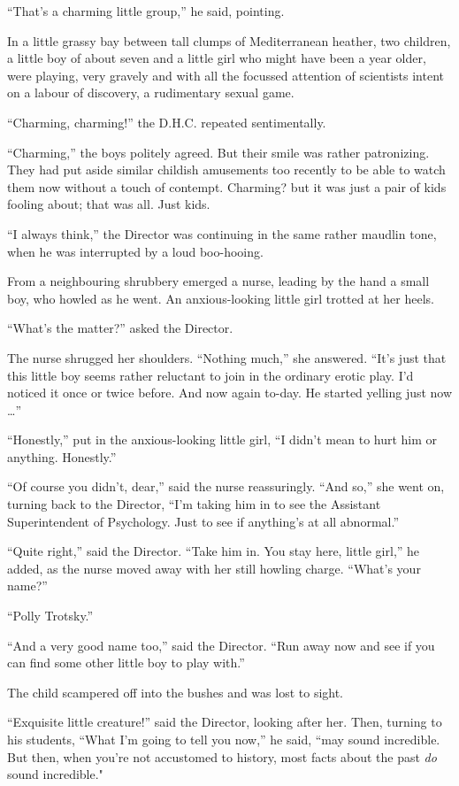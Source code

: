 \documentclass[12pt]{report}
\begin{document}
``That's a charming little group,'' he said, pointing.

In a little grassy bay between tall clumps of Mediterranean heather, two
children, a little boy of about seven and a little girl who might have
been a year older, were playing, very gravely and with all the focussed
attention of scientists intent on a labour of discovery, a rudimentary
sexual game.

``Charming, charming!'' the D.H.C. repeated sentimentally.

``Charming,'' the boys politely agreed. But their smile was rather
patronizing. They had put aside similar childish amusements too recently
to be able to watch them now without a touch of contempt. Charming? but
it was just a pair of kids fooling about; that was all. Just kids.

``I always think,'' the Director was continuing in the same rather
maudlin tone, when he was interrupted by a loud boo-hooing.

From a neighbouring shrubbery emerged a nurse, leading by the hand a
small boy, who howled as he went. An anxious-looking little girl trotted
at her heels.

``What's the matter?'' asked the Director.

The nurse shrugged her shoulders. ``Nothing much,'' she answered. ``It's
just that this little boy seems rather reluctant to join in the ordinary
erotic play. I'd noticed it once or twice before. And now again to-day.
He started yelling just now \ldots{}''

``Honestly,'' put in the anxious-looking little girl, ``I didn't mean to
hurt him or anything. Honestly.''

``Of course you didn't, dear,'' said the nurse reassuringly. ``And so,''
she went on, turning back to the Director, ``I'm taking him in to see
the Assistant Superintendent of Psychology. Just to see if anything's at
all abnormal.''

``Quite right,'' said the Director. ``Take him in. You stay here, little
girl,'' he added, as the nurse moved away with her still howling charge.
``What's your name?''

``Polly Trotsky.''

``And a very good name too,'' said the Director. ``Run away now and see
if you can find some other little boy to play with.''

The child scampered off into the bushes and was lost to sight.

``Exquisite little creature!'' said the Director, looking after her.
Then, turning to his students, ``What I'm going to tell you now,'' he
said, ``may sound incredible. But then, when you're not accustomed to
history, most facts about the past \emph{do} sound incredible."
\end{document}
